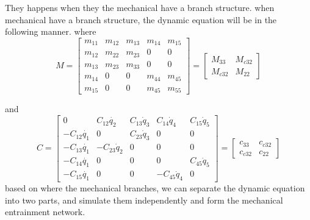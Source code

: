 They happens when they the mechanical have a branch structure.
when mechanical have a branch structure,
the dynamic equation will be in the following manner.
where
\[
M=\left[\begin{array}{ccc|cc}
m_{11} & m_{12} & m_{13} & m_{14} & m_{15}\\
m_{12} & m_{22} & m_{23} & 0 & 0\\
m_{13} & m_{23} & m_{33} & 0 & 0\\ \hline
m_{14} & 0 & 0 & m_{44} & m_{45}\\
m_{15} & 0 & 0 & m_{45} & m_{55}\end{array}\right]
=\left[\begin{array}{cc}
M_{33} & M_{c32}\\
M_{c32} & M_{22}\end{array}\right]
\]

and
\[
C=
\left[\begin{array}{ccc|cc}
0 & C_{12}\dot{q_{2}} & C_{13}\dot{q}_{3} & C_{14}\dot{q}_{4} & C_{15}\dot{q}_{5}\\
-C_{12}\dot{q_{1}} & 0 & C_{23}\dot{q}_{3} & 0 & 0\\
-C_{13}\dot{q_{1}} & -C_{23}\dot{q}_{2} & 0 & 0 & 0\\ \hline
-C_{14}\dot{q_{1}} & 0 & 0 & 0 & C_{45}\dot{q}_{5}\\
-C_{15}\dot{q_{1}} & 0 & 0 & -C_{45}\dot{q}_{4} & 0\end{array}\right]
=\left[\begin{array}{cc}
c_{33} & c_{c32}\\
c_{c32} & c_{22}\end{array}\right]
\]
based on where the mechanical branches, we can separate the dynamic equation into two parts,
and simulate them independently and form the mechanical entrainment network.


